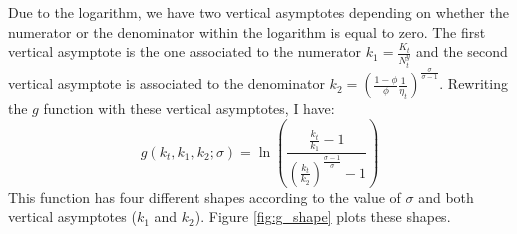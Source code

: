 Due to the logarithm, we have two vertical asymptotes depending on whether the numerator or the denominator within the logarithm is equal to zero. The first vertical asymptote is the one associated to the numerator $k_1 = \frac{K_t}{N_t^y}$ and the second vertical asymptote is associated to the denominator $k_2 = \left(\frac{1-\phi}{\phi} \frac{1}{\eta_t}\right)^{\frac{\sigma}{\sigma-1}}$. Rewriting the $g$ function with these vertical asymptotes, I have:
\begin{equation*}
g(k_t, k_1, k_2; \sigma) = \ln\left( \frac{\frac{k_t}{k_1}-1}{\left(\frac{k_t}{k_2}\right)^{\frac{\sigma - 1}{\sigma}} - 1} \right)
\end{equation*}
This function has four different shapes according to the value of $\sigma$ and both vertical asymptotes ($k_1$ and $k_2$). Figure \ref{fig:g_shape} plots these shapes.
